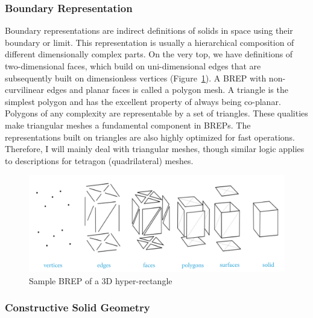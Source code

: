 \documentclass[a4paper,11pt,oneside]{article}
\begin{document}
\subsubsection{Boundary Representation}
    
Boundary representations are indirect definitions of solids in space using their boundary or limit. This representation is usually a hierarchical composition of different dimensionally complex parts. On the very top, we have definitions of two-dimensional faces, which build on uni-dimensional edges that are subsequently built on dimensionless vertices (Figure~\ref{fig2:brep_3d_rect}). A BREP with non-curvilinear edges and planar faces is called a polygon mesh. A triangle is the simplest polygon and has the excellent property of always being co-planar. Polygons of any complexity are representable by a set of triangles. These qualities make triangular meshes a fundamental component in BREPs. The representations built on triangles are also highly optimized for fast operations. Therefore, I will mainly deal with triangular meshes, though similar logic applies to descriptions for tetragon (quadrilateral) meshes. 
    
    
\begin{figure}[ht]
	\begin{center}
		\includegraphics[width=.8\textwidth]{section1/brep-overview.png}
	\end{center}
	\caption{Sample BREP of a 3D hyper-rectangle~\cite{wikipedia_2021_mesh_rep}}
	\label{fig2:brep_3d_rect}
\end{figure}
    
\subsubsection{Constructive Solid Geometry}
\end{document}
